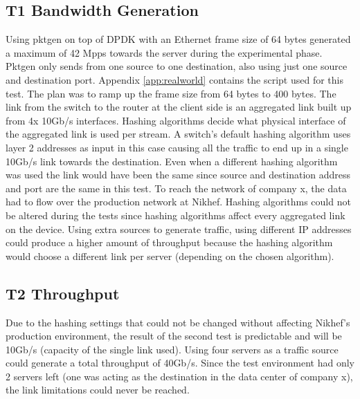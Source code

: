 \subsection{T1 Bandwidth Generation}
Using pktgen on top of DPDK with an Ethernet frame size of 64 bytes generated a maximum of 42 Mpps towards the server during the experimental phase. 
Pktgen only sends from one source to one destination, also using just one source and destination port. 
Appendix \ref{app:realworld} contains the script used for this test. The plan was to ramp up the frame size from 64 bytes to 400 bytes. 
The link from the switch to the router at the client side is an aggregated link built up from 4x 10Gb/s interfaces. 
Hashing algorithms \cite{hashing} decide what physical interface of the aggregated link is used per stream. 
A switch's default hashing algorithm uses layer 2 addresses as input in this case causing all the traffic to end up in a single 10Gb/s link towards the destination. 
Even when a different hashing algorithm was used the link would have been the same since source and destination address and port are the same in this test. 
To reach the network of company x, the data had to flow over the production network at Nikhef. Hashing algorithms could not be altered during the tests since hashing algorithms affect every aggregated link on the device. 
Using extra sources to generate traffic, using different IP addresses could produce a higher amount of throughput because the hashing algorithm would choose a different link per server (depending on the chosen algorithm).  

\subsection{T2 Throughput}
Due to the hashing settings that could not be changed without affecting Nikhef's production environment, the result of the second test is predictable and will be 10Gb/s (capacity of the single link used). 
Using four servers as a traffic source could generate a total throughput of 40Gb/s. Since the test environment had only 2 servers left (one was acting as the destination in the data center of company x), the link limitations could never be reached. 

